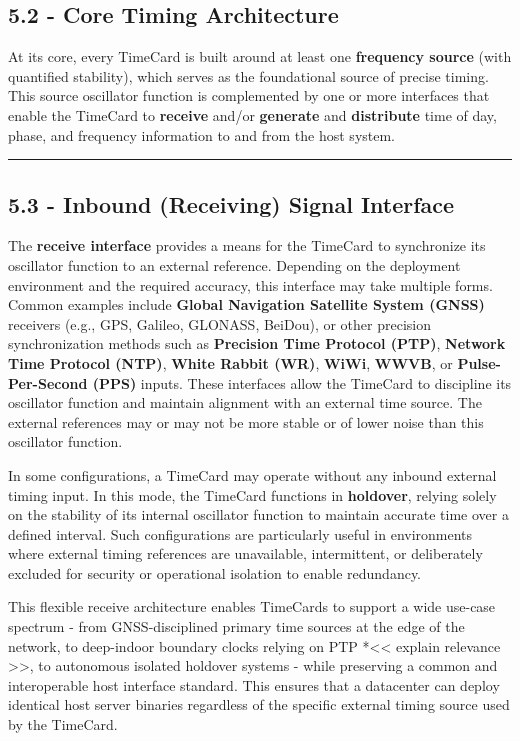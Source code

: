 \documentclass[
]{article}
\begin{document}
\subsection{5.2 - Core Timing
Architecture}\label{core-timing-architecture}

At its core, every TimeCard is built around at least one
\textbf{frequency source} (with quantified stability), which serves as
the foundational source of precise timing. This source oscillator
function is complemented by one or more interfaces that enable the
TimeCard to \textbf{receive} and/or \textbf{generate} and
\textbf{distribute} time of day, phase, and frequency information to and
from the host system.

\begin{center}\rule{0.5\linewidth}{0.5pt}\end{center}

\subsection{5.3 - Inbound (Receiving) Signal
Interface}\label{inbound-receiving-signal-interface}

The \textbf{receive interface} provides a means for the TimeCard to
synchronize its oscillator function to an external reference. Depending
on the deployment environment and the required accuracy, this interface
may take multiple forms. Common examples include \textbf{Global
Navigation Satellite System (GNSS)} receivers (e.g., GPS, Galileo,
GLONASS, BeiDou), or other precision synchronization methods such as
\textbf{Precision Time Protocol (PTP)}, \textbf{Network Time Protocol
(NTP)}, \textbf{White Rabbit (WR)}, \textbf{WiWi}, \textbf{WWVB}, or
\textbf{Pulse-Per-Second (PPS)} inputs. These interfaces allow the
TimeCard to discipline its oscillator function and maintain alignment
with an external time source. The external references may or may not be
more stable or of lower noise than this oscillator function.

In some configurations, a TimeCard may operate without any inbound
external timing input. In this mode, the TimeCard functions in
\textbf{holdover}, relying solely on the stability of its internal
oscillator function to maintain accurate time over a defined interval.
Such configurations are particularly useful in environments where
external timing references are unavailable, intermittent, or
deliberately excluded for security or operational isolation to enable
redundancy.

This flexible receive architecture enables TimeCards to support a wide
use-case spectrum - from GNSS-disciplined primary time sources at the
edge of the network, to deep-indoor boundary clocks relying on PTP
*\textless\textless{} explain relevance \textgreater\textgreater*, to
autonomous isolated holdover systems - while preserving a common and
interoperable host interface standard. This ensures that a datacenter
can deploy identical host server binaries regardless of the specific
external timing source used by the TimeCard.
\end{document}
